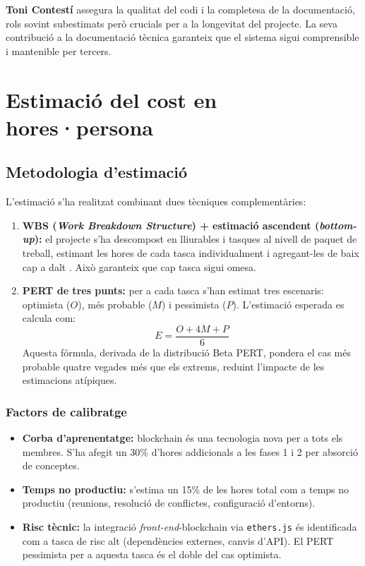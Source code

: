 \documentclass[12pt,a4paper,catalan]{article}
\begin{document}
\textbf{Toni Contestí} assegura la qualitat del codi i la completesa de la documentació, rols sovint subestimats però crucials per a la longevitat del projecte. La seva contribució a la documentació tècnica garanteix que el sistema sigui comprensible i mantenible per tercers.

\section{Estimació del cost en hores·persona}

\subsection{Metodologia d'estimació}

L'estimació s'ha realitzat combinant dues tècniques complementàries:

\begin{enumerate}
    \item \textbf{WBS (\textit{Work Breakdown Structure}) + estimació ascendent (\textit{bottom-up}):} el projecte s'ha descompost en lliurables i tasques al nivell de paquet de treball, estimant les hores de cada tasca individualment i agregant-les de baix cap a dalt \cite{projectmanager2023}. Això garanteix que cap tasca sigui omesa.
    \item \textbf{PERT de tres punts:} per a cada tasca s'han estimat tres escenaris: optimista ($O$), més probable ($M$) i pessimista ($P$). L'estimació esperada es calcula com:
    \[
        E = \frac{O + 4M + P}{6}
    \]
    Aquesta fórmula, derivada de la distribució Beta PERT, pondera el cas més probable quatre vegades més que els extrems, reduint l'impacte de les estimacions atípiques.
\end{enumerate}

\subsubsection{Factors de calibratge}

\begin{itemize}
    \item \textbf{Corba d'aprenentatge:} blockchain és una tecnologia nova per a tots els membres. S'ha afegit un 30\% d'hores addicionals a les fases 1 i 2 per absorció de conceptes.
    \item \textbf{Temps no productiu:} s'estima un 15\% de les hores total com a temps no productiu (reunions, resolució de conflictes, configuració d'entorns).
    \item \textbf{Risc tècnic:} la integració \textit{front-end}-blockchain via \texttt{ethers.js} és identificada com a tasca de risc alt (dependències externes, canvis d'API). El PERT pessimista per a aquesta tasca és el doble del cas optimista.
\end{itemize}
\end{document}
